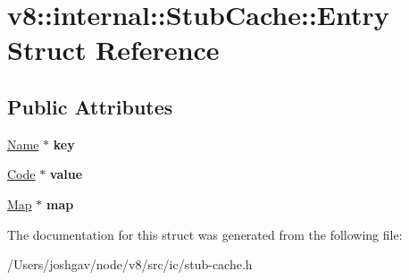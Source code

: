 \hypertarget{structv8_1_1internal_1_1_stub_cache_1_1_entry}{}\section{v8\+:\+:internal\+:\+:Stub\+Cache\+:\+:Entry Struct Reference}
\label{structv8_1_1internal_1_1_stub_cache_1_1_entry}
\subsection*{Public Attributes}
\begin{DoxyCompactItemize}
\item 
\hyperlink{classv8_1_1internal_1_1_name}{Name} $\ast$ {\bfseries key}\hypertarget{structv8_1_1internal_1_1_stub_cache_1_1_entry_afb66c61baba5124c3e9925fb95eb82ec}{}\label{structv8_1_1internal_1_1_stub_cache_1_1_entry_afb66c61baba5124c3e9925fb95eb82ec}

\item 
\hyperlink{classv8_1_1internal_1_1_code}{Code} $\ast$ {\bfseries value}\hypertarget{structv8_1_1internal_1_1_stub_cache_1_1_entry_ae31a6f7c9bc6e721095dc7a3e4b7c8a2}{}\label{structv8_1_1internal_1_1_stub_cache_1_1_entry_ae31a6f7c9bc6e721095dc7a3e4b7c8a2}

\item 
\hyperlink{classv8_1_1internal_1_1_map}{Map} $\ast$ {\bfseries map}\hypertarget{structv8_1_1internal_1_1_stub_cache_1_1_entry_a439778e1e715dc39104cd6841ceb168a}{}\label{structv8_1_1internal_1_1_stub_cache_1_1_entry_a439778e1e715dc39104cd6841ceb168a}

\end{DoxyCompactItemize}


The documentation for this struct was generated from the following file\+:\begin{DoxyCompactItemize}
\item 
/\+Users/joshgav/node/v8/src/ic/stub-\/cache.\+h\end{DoxyCompactItemize}
